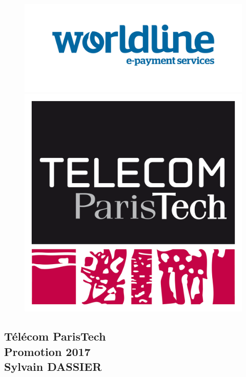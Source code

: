 \documentclass[a4paper,11pt]{article}
\begin{document}
	\sloppy
	\fontsize{12pt}{18pt}\selectfont
	\begin{figure}[htbp]
		\begin{minipage}[b]{0.5\linewidth}
			\centering
			\includegraphics[width=\linewidth]{pictures/worldline.jpg}
		\end{minipage}
		\hspace{3cm}
		\begin{minipage}[b]{0.25\linewidth}
			\centering
			\includegraphics[width=\linewidth]{pictures/telecom.png}
		\end{minipage}
	\end{figure}

	\begin{center}
	\section*{Télécom ParisTech \\
	Promotion 2017 \\
	Sylvain DASSIER
	}
	\end{center}
\end{document}
